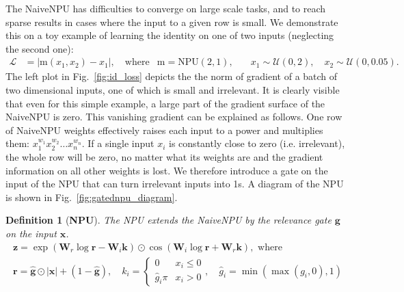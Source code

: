 \documentclass[9pt]{article}
\newtheorem*{definition}{Definition}
\newcommand{\Wre}{\bm W_{r}}
\newcommand{\Wim}{\bm W_{i}}
\newcommand{\npu}{\text{NPU}}
\begin{document}
The NaiveNPU has difficulties to converge on large scale tasks, and to reach
sparse results in cases where the input to a given row is small. We
demonstrate this on a toy example of learning the identity on one of two inputs
(neglecting the second one):
\begin{align}
  \nonumber
  \mathcal{L} &= |\text{m}(x_1,x_2) - x_1|, \quad \text{where}
  & \text{m} = \npu(2,1), \quad
  &x_1 \sim \mathcal U(0,2), \quad x_2 \sim \mathcal U(0,0.05).
\end{align}
The left plot in Fig.~\ref{fig:id_loss} depicts
the the norm of gradient of a batch of two dimensional inputs, one of which is small and
irrelevant. It is clearly visible that even for this simple example, a large
part of the gradient surface of the NaiveNPU is zero.  This vanishing gradient can be explained
as follows. One row of NaiveNPU weights effectively raises each input to a power and
multiplies them: $x_1^{w_1} x_2^{w_2} \dots x_n^{w_n}$. If a single input $x_i$
is constantly close to zero (i.e. irrelevant), the whole row will be zero, no
matter what its weights are and the gradient information on all other weights
is lost.  We therefore introduce a gate on the input of the NPU that can turn
irrelevant inputs into 1s.
A diagram of the NPU is shown in Fig.~\ref{fig:gatednpu_diagram}.
\begin{definition}[{\bf NPU}]
  The NPU extends the NaiveNPU by the relevance gate $\bm g$ on the input $\bm x$.
   \begin{gather}
    \label{eq:gatednpu_def}
    \bm z = \exp(\Wre \log\bm r - \Wim\bm k) 
          \odot \cos(\Wim\log \bm r + \Wre\bm k), \text{ where } \\
    \bm r = \bm{\hat g} \odot |\bm x| + (1-\bm{\hat g}),
    \quad
    k_i = \begin{cases}
       0  & x_i \leq 0 \\
      \hat g_i\pi & x_i > 0
    \end{cases},
    \quad
    \hat g_i = \min(\max(g_i,0),1)
  \end{gather}
\end{definition}
\end{document}
